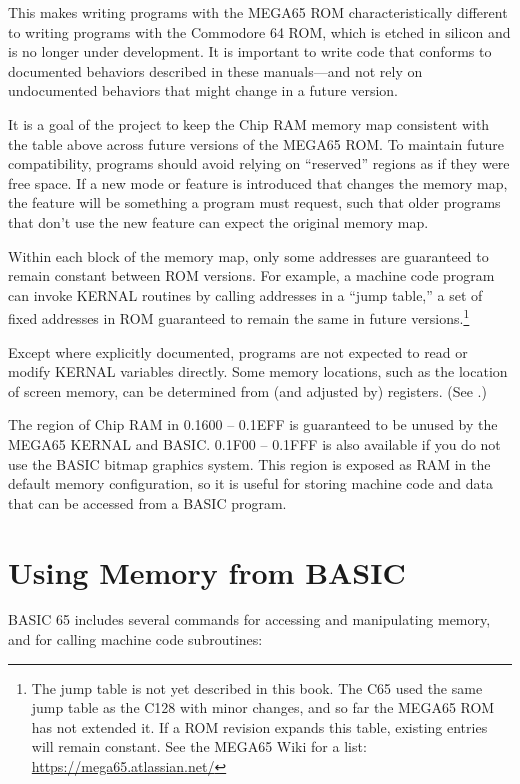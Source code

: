 This makes writing programs with the MEGA65 ROM characteristically different
to writing programs with the Commodore 64 ROM, which is etched in silicon
and is no longer under development. It is important to write code that
conforms to documented behaviors described in these manuals---and not rely on
undocumented behaviors that might change in a future version.

It is a goal of the project to keep the Chip RAM memory map consistent with
the table above across future versions of the MEGA65 ROM. To maintain future
compatibility, programs should avoid relying on ``reserved'' regions as if
they were free space. If a new mode or feature is introduced that changes the
memory map, the feature will be something a program must request, such that older
programs that don't use the new feature can expect the original memory map.

Within each block of the memory map, only some addresses are guaranteed to
remain constant between ROM versions. For example, a machine code program can
invoke KERNAL routines by calling addresses in a ``jump table,'' a set of
fixed addresses in ROM guaranteed to remain the same in future
versions.\footnote{The jump table is not yet described in this book. The C65
used the same jump table as the C128 with minor changes, and so far the MEGA65
ROM has not extended it. If a ROM revision expands this table, existing
entries will remain constant. See the MEGA65 Wiki for a list:
\url{https://mega65.atlassian.net/}}

Except where explicitly documented, programs are not expected to read or
modify KERNAL variables directly. Some memory locations, such as the location
of screen memory, can be determined from (and adjusted by) registers. (See
.)

The region of Chip RAM in 0.1600 -- 0.1EFF is guaranteed to be unused by the
MEGA65 KERNAL and BASIC. 0.1F00 -- 0.1FFF is also available if you do not use the
BASIC bitmap graphics system. This region is exposed as RAM in the default memory
configuration, so it is useful for storing machine code and data that can be
accessed from a BASIC program.


\newpage
\section{Using Memory from BASIC}

BASIC 65 includes several commands for accessing and manipulating memory, and
for calling machine code subroutines:

